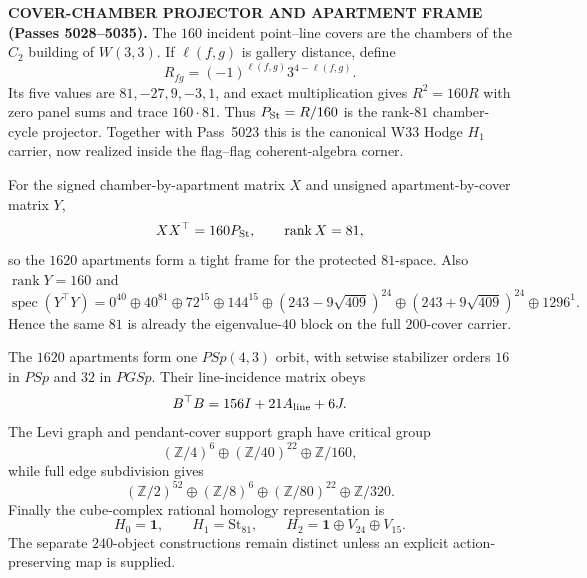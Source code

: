 \smallskip
\textbf{COVER-CHAMBER PROJECTOR AND APARTMENT FRAME (Passes 5028--5035).}
The $160$ incident point--line covers are the chambers of the $C_2$ building of $W(3,3)$. If $\ell(f,g)$ is gallery distance, define
\[
R_{fg}=(-1)^{\ell(f,g)}3^{4-\ell(f,g)}.
\]
Its five values are $81,-27,9,-3,1$, and exact multiplication gives $R^2=160R$ with zero panel sums and trace $160\cdot81$. Thus $P_{\rm St}=R/160$ is the rank-$81$ chamber-cycle projector. Together with Pass~5023 this is the canonical W33 Hodge $H_1$ carrier, now realized inside the flag--flag coherent-algebra corner.

For the signed chamber-by-apartment matrix $X$ and unsigned apartment-by-cover matrix $Y$,
\[
XX^\top=160P_{\rm St},\qquad \operatorname{rank}X=81,
\]
so the $1620$ apartments form a tight frame for the protected $81$-space. Also $\operatorname{rank}Y=160$ and
\[
\operatorname{spec}(Y^\top Y)=0^{40}\oplus40^{81}\oplus72^{15}\oplus144^{15}\oplus(243-9\sqrt{409})^{24}\oplus(243+9\sqrt{409})^{24}\oplus1296^1.
\]
Hence the same $81$ is already the eigenvalue-$40$ block on the full $200$-cover carrier.

The $1620$ apartments form one $PSp(4,3)$ orbit, with setwise stabilizer orders $16$ in $PSp$ and $32$ in $PGSp$. Their line-incidence matrix obeys
\[
B^\top B=156I+21A_{\rm line}+6J.
\]
The Levi graph and pendant-cover support graph have critical group
\[
(\mathbb Z/4)^6\oplus(\mathbb Z/40)^{22}\oplus\mathbb Z/160,
\]
while full edge subdivision gives
\[
(\mathbb Z/2)^{52}\oplus(\mathbb Z/8)^6\oplus(\mathbb Z/80)^{22}\oplus\mathbb Z/320.
\]
Finally the cube-complex rational homology representation is
\[
H_0=\mathbf1,\qquad H_1=\mathrm{St}_{81},\qquad H_2=\mathbf1\oplus V_{24}\oplus V_{15}.
\]
The separate $240$-object constructions remain distinct unless an explicit action-preserving map is supplied.
